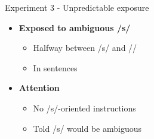 \documentclass{beamer}
\begin{document}
\begin{frame}{Experiment 3 - Unpredictable exposure}

\begin{minipage}{0.45\textwidth}
\begin{itemize}
\item \textbf{Exposed to ambiguous /s/}
\begin{itemize}
\item Halfway between /s/ and /\textesh/
\item In sentences
\end{itemize}

\item \textbf{Attention}
\begin{itemize}
\item No /s/-oriented instructions
\item Told /s/ would be ambiguous
\end{itemize}


\end{itemize}
\end{minipage}
\end{frame}
\end{document}

